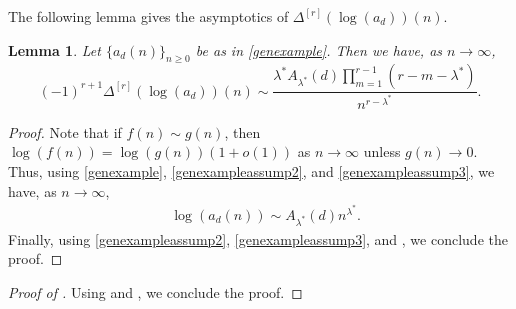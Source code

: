 \documentclass[11pt,reqno,a4paper]{amsart}
\renewcommand{\l}{\lambda}
\renewcommand{\(}{\left\(}
\renewcommand{\)}{\right\)}
\numberwithin{equation}{section}
\theoremstyle{plain}
\newtheorem{lemma}[theorem]{Lemma}
\theoremstyle{definition} %
\numberwithin{equation}{section}
\begin{document}
The following lemma gives the asymptotics of $\Delta^{[r]}(\log(a_d))(n)$.

\begin{lemma}\label{logdifflem2}
	Let $\{a_d(n)\}_{n\ge 0}$ be as in \eqref{genexample}. Then we have, as $n\to \infty$,
	\[
	(-1)^{r+1}\Delta^{[r]}\left(\log(a_d)\right)(n)\sim \frac{\l^*A_{\l^*}(d)\prod_{m=1}^{r-1}\left(r-m-\l^*\right)}{n^{r-\l^*}}.
	\]
\end{lemma}
\begin{proof}
Note that if $f(n)\sim g(n)$, then $\log (f(n))= \log(g(n))(1+o(1))$ as $n\to \infty$ unless $g(n)\to 0$. Thus, using \eqref{genexample}, \ref{genexampleassump2}, and \ref{genexampleassump3}, we have, as $n \to \infty$, 
	\begin{align*}\nonumber 
	&\log(a_d(n))
	\sim A_{\l^*}(d)n^{\l^*}.
	\end{align*}
 Finally, using \ref{genexampleassump2}, \ref{genexampleassump3}, and  , we conclude the proof.\qedhere 
\end{proof}








\begin{proof}[Proof of ]
 Using  and , we conclude the proof.\qedhere
\end{proof}
\end{document}
